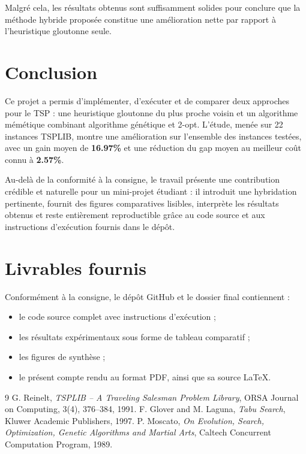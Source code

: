 \documentclass[11pt,a4paper]{article}
\begin{document}
Malgré cela, les résultats obtenus sont suffisamment solides pour conclure que la méthode hybride proposée constitue une amélioration nette par rapport à l'heuristique gloutonne seule.

\section{Conclusion}
Ce projet a permis d'implémenter, d'exécuter et de comparer deux approches pour le TSP : une heuristique gloutonne du plus proche voisin et un algorithme mémétique combinant algorithme génétique et 2-opt. L'étude, menée sur 22 instances TSPLIB, montre une amélioration sur l'ensemble des instances testées, avec un gain moyen de \textbf{16.97\%} et une réduction du gap moyen au meilleur coût connu à \textbf{2.57\%}.

Au-delà de la conformité à la consigne, le travail présente une contribution crédible et naturelle pour un mini-projet étudiant : il introduit une hybridation pertinente, fournit des figures comparatives lisibles, interprète les résultats obtenus et reste entièrement reproductible grâce au code source et aux instructions d'exécution fournis dans le dépôt.

\section*{Livrables fournis}
Conformément à la consigne, le dépôt GitHub et le dossier final contiennent :
\begin{itemize}[leftmargin=1.2cm]
    \item le code source complet avec instructions d'exécution ;
    \item les résultats expérimentaux sous forme de tableau comparatif ;
    \item les figures de synthèse ;
    \item le présent compte rendu au format PDF, ainsi que sa source LaTeX.
\end{itemize}

\begin{thebibliography}{9}
 G. Reinelt, \emph{TSPLIB -- A Traveling Salesman Problem Library}, ORSA Journal on Computing, 3(4), 376--384, 1991.
 F. Glover and M. Laguna, \emph{Tabu Search}, Kluwer Academic Publishers, 1997.
 P. Moscato, \emph{On Evolution, Search, Optimization, Genetic Algorithms and Martial Arts}, Caltech Concurrent Computation Program, 1989.
\end{thebibliography}
\end{document}
